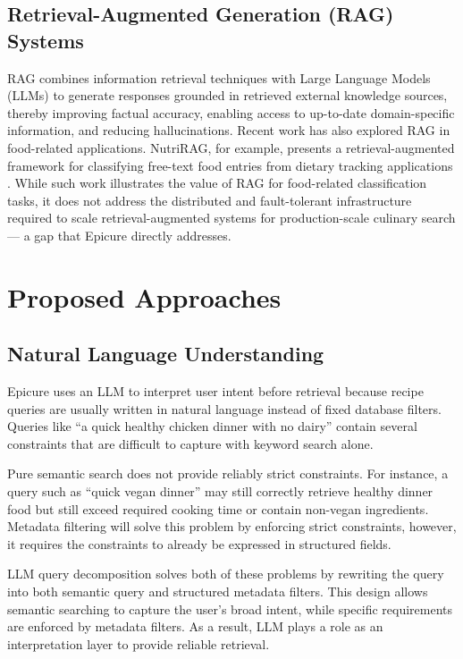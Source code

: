 \documentclass[conference]{IEEEtran}
\begin{document}
\subsection{Retrieval-Augmented Generation (RAG) Systems}
RAG combines information retrieval techniques with Large Language Models (LLMs) to generate responses grounded in retrieved external knowledge sources, thereby improving factual accuracy, enabling access to up-to-date domain-specific information, and reducing hallucinations. Recent work has also explored RAG in food-related applications. NutriRAG, for example, presents a retrieval-augmented framework for classifying free-text food entries from dietary tracking applications \cite{Zhou2025NutriRAGUT}. While such work illustrates the value of RAG for food-related classification tasks, it does not address the distributed and fault-tolerant infrastructure required to scale retrieval-augmented systems for production-scale culinary search — a gap that Epicure directly addresses.

\section{Proposed Approaches}
\label{sec:proposed_approaches}

\subsection{Natural Language Understanding}
Epicure uses an LLM to interpret user intent before retrieval because recipe queries are usually written in natural language instead of fixed database filters. Queries like ``a quick healthy chicken dinner with no dairy'' contain several constraints that are difficult to capture with keyword search alone.

Pure semantic search does not provide reliably strict constraints. For instance, a query such as ``quick vegan dinner'' may still correctly retrieve healthy dinner food but still exceed required cooking time or contain non-vegan ingredients. Metadata filtering will solve this problem by enforcing strict constraints, however, it requires the constraints to already be expressed in structured fields.

LLM query decomposition solves both of these problems by rewriting the query into both semantic query and structured metadata filters. This design allows semantic searching to capture the user’s broad intent, while specific requirements are enforced by metadata filters. As a result, LLM plays a role as an interpretation layer to provide reliable retrieval.
\end{document}
